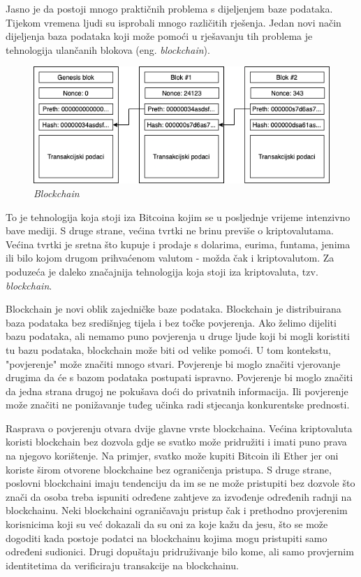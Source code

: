 \documentclass[times, utf8, diplomski]{fer}
\begin{document}
Jasno je da postoji mnogo praktičnih problema s dijeljenjem baze podataka. Tijekom vremena ljudi su isprobali mnogo različitih rješenja. Jedan novi način dijeljenja baza podataka koji može pomoći u rješavanju tih problema je tehnologija ulančanih blokova (eng. \textit{blockchain}). 
\begin{figure}[htb]
\centering
\includegraphics[width=12cm]{imgs/Blockchain.png}
\caption{\textit{Blockchain}}
\label{fig:blockchain}
\end{figure}
To je tehnologija koja stoji iza Bitcoina kojim se u posljednje vrijeme intenzivno bave mediji.  S druge strane, većina tvrtki ne brinu previše o kriptovalutama. Većina tvrtki je sretna što kupuje i prodaje s dolarima, eurima, funtama,  jenima ili bilo kojom drugom prihvaćenom valutom - možda čak i kriptovalutom.  Za poduzeća je daleko značajnija tehnologija koja stoji iza kriptovaluta, tzv.  \textit{blockchain}.

Blockchain je novi oblik zajedničke baze podataka.  Blockchain je distribuirana baza podataka bez središnjeg tijela i bez točke povjerenja. Ako želimo dijeliti bazu podataka, ali nemamo puno povjerenja u druge ljude koji bi mogli koristiti tu bazu podataka, blockchain može biti od velike pomoći. U tom kontekstu, "povjerenje" može značiti mnogo stvari. Povjerenje bi moglo značiti vjerovanje drugima da će s bazom podataka postupati ispravno. Povjerenje bi moglo značiti da jedna strana drugoj ne pokušava doći do privatnih informacija. Ili povjerenje može značiti ne ponižavanje tuđeg učinka radi stjecanja konkurentske prednosti.

Rasprava o povjerenju otvara dvije glavne vrste blockchaina. Većina kriptovaluta koristi blockchain bez dozvola gdje se svatko može pridružiti i imati puno prava na njegovo korištenje. Na primjer, svatko može kupiti Bitcoin ili Ether jer oni koriste širom otvorene blockchaine bez ograničenja pristupa. S druge strane, poslovni blockchaini imaju tendenciju da im se ne može pristupiti bez dozvole što znači da osoba treba ispuniti određene zahtjeve za izvođenje određenih radnji na blockchainu. Neki blockchaini ograničavaju pristup čak i prethodno provjerenim korisnicima koji su već dokazali da su oni za koje kažu da jesu, što se može dogoditi kada postoje podatci na blockchainu kojima mogu pristupiti samo određeni sudionici. Drugi dopuštaju pridruživanje bilo kome, ali samo provjernim identitetima da verificiraju transakcije na blockchainu.
\end{document}
